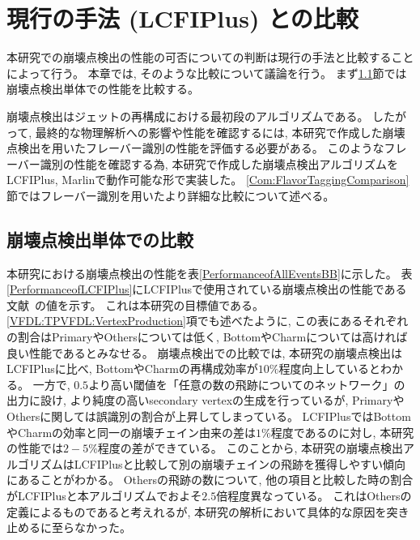 
\chapter{現行の手法 (LCFIPlus) との比較} \label{chap:Comparison}

本研究での崩壊点検出の性能の可否についての判断は現行の手法と比較することによって行う。
本章では, そのような比較について議論を行う。
まず\ref{Com:ComparisonwithVF}節では崩壊点検出単体での性能を比較する。

崩壊点検出はジェットの再構成における最初段のアルゴリズムである。
したがって, 最終的な物理解析への影響や性能を確認するには, 本研究で作成した崩壊点検出を用いたフレーバー識別の性能を評価する必要がある。
このようなフレーバー識別の性能を確認する為, 本研究で作成した崩壊点検出アルゴリズムをLCFIPlus, Marlinで動作可能な形で実装した。
\ref{Com:FlavorTaggingComparison}節ではフレーバー識別を用いたより詳細な比較について述べる。


\section{崩壊点検出単体での比較} \label{Com:ComparisonwithVF}

本研究における崩壊点検出の性能を表\ref{PerformanceofAllEventsBB}に示した。
表\ref{PerformanceofLCFIPlus}にLCFIPlusで使用されている崩壊点検出の性能である文献~\cite{LCFIPlusPaper}の値を示す。
これは本研究の目標値である。
\ref{VFDL:TPVFDL:VertexProduction}項でも述べたように, この表にあるそれぞれの割合はPrimaryやOthersについては低く, BottomやCharmについては高ければ良い性能であるとみなせる。
崩壊点検出での比較では, 本研究の崩壊点検出はLCFIPlusに比べ, BottomやCharmの再構成効率が$10\%$程度向上しているとわかる。
一方で, $0.5$より高い閾値を「任意の数の飛跡についてのネットワーク」の出力に設け, より純度の高いsecondary vertexの生成を行っているが, PrimaryやOthersに関しては誤識別の割合が上昇してしまっている。
LCFIPlusではBottomやCharmの効率と同一の崩壊チェイン由来の差は$1\%$程度であるのに対し, 本研究の性能では$2-5\%$程度の差ができている。
このことから, 本研究の崩壊点検出アルゴリズムはLCFIPlusと比較して別の崩壊チェインの飛跡を獲得しやすい傾向にあることがわかる。
Othersの飛跡の数について, 他の項目と比較した時の割合がLCFIPlusと本アルゴリズムでおよそ$2.5$倍程度異なっている。
これはOthersの定義によるものであると考えれるが, 本研究の解析において具体的な原因を突き止めるに至らなかった。\\

